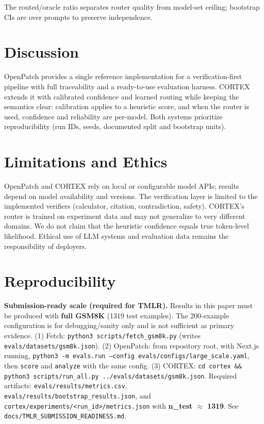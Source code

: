 \documentclass[11pt]{article}
\begin{document}
The routed/oracle ratio separates router quality from model-set ceiling; bootstrap CIs are over prompts to preserve independence.

\section{Discussion}
\label{sec:discussion}

OpenPatch provides a single reference implementation for a verification-first pipeline with full traceability and a ready-to-use evaluation harness. CORTEX extends it with calibrated confidence and learned routing while keeping the semantics clear: calibration applies to a heuristic score, and when the router is used, confidence and reliability are per-model. Both systems prioritize reproducibility (run IDs, seeds, documented split and bootstrap units).

\section{Limitations and Ethics}
\label{sec:limits}

OpenPatch and CORTEX rely on local or configurable model APIs; results depend on model availability and versions. The verification layer is limited to the implemented verifiers (calculator, citation, contradiction, safety). CORTEX's router is trained on experiment data and may not generalize to very different domains. We do not claim that the heuristic confidence equals true token-level likelihood. Ethical use of LLM systems and evaluation data remains the responsibility of deployers.

\section{Reproducibility}
\label{sec:repro}

\textbf{Submission-ready scale (required for TMLR).} Results in this paper must be produced with \textbf{full GSM8K} (1319 test examples). The 200-example configuration is for debugging/sanity only and is not sufficient as primary evidence. (1) Fetch: \texttt{python3 scripts/fetch\_gsm8k.py} (writes \texttt{evals/datasets/gsm8k.json}). (2) OpenPatch: from repository root, with Next.js running, \texttt{python3 -m evals.run --config evals/configs/large\_scale.yaml}, then \texttt{score} and \texttt{analyze} with the same config. (3) CORTEX: \texttt{cd cortex \&\& python3 scripts/run\_all.py ../evals/datasets/gsm8k.json}. Required artifacts: \texttt{evals/results/metrics.csv}, \texttt{evals/results/bootstrap\_results.json}, and \texttt{cortex/experiments/<run\_id>/metrics.json} with \textbf{n\_test $\approx$ 1319}. See \texttt{docs/TMLR\_SUBMISSION\_READINESS.md}.
\end{document}
